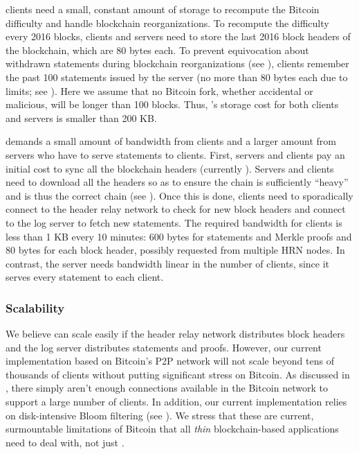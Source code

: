 \Sys clients need a small, constant amount of storage to recompute the Bitcoin difficulty and handle blockchain reorganizations.
To recompute the difficulty every 2016 blocks, \Sys clients and servers need to store the last 2016 block headers of the blockchain, which are 80 bytes each.
To prevent equivocation about withdrawn statements during blockchain reorganizations (see ), \Sys clients remember the past 100 statements issued by the server (no more than 80 bytes each due to \opret limits; see ).
Here we assume that no Bitcoin fork, whether accidental or malicious, will be longer than 100 blocks.
Thus, \Sys's storage cost for both clients and servers is smaller than 200 KB.

\Sys demands a small amount of bandwidth from clients and a larger amount from servers who have to serve statements to clients.
First, servers and clients pay an initial cost to sync all the blockchain headers (currently \headerssize).
Servers and clients need to download all the headers so as to ensure the chain is sufficiently ``heavy'' and is thus the correct chain (see ).
Once this is done, \Sys clients need to sporadically connect to the header relay network to check for new block headers and connect to the log server to fetch new statements.
The required bandwidth for clients is less than 1 KB every 10 minutes: 600 bytes for statements and Merkle proofs and 80 bytes for each block header, possibly requested from multiple HRN nodes.
In contrast, the server needs bandwidth linear in the number of \Sys clients, since it serves every statement to each client.

\subsubsection{Scalability}
We believe \Sys can scale easily if the header relay network distributes block headers and the \Sys log server distributes statements and proofs.
However, our current implementation based on Bitcoin's P2P network will not scale beyond tens of thousands of \Sys clients without putting significant stress on Bitcoin.
As discussed in , there simply aren't enough connections available in the Bitcoin network to support a large number of \Sys clients.
In addition, our current implementation relies on disk-intensive Bloom filtering (see ).
We stress that these are current, surmountable limitations of Bitcoin that all \emph{thin} blockchain-based applications need to deal with, not just \Sys.

